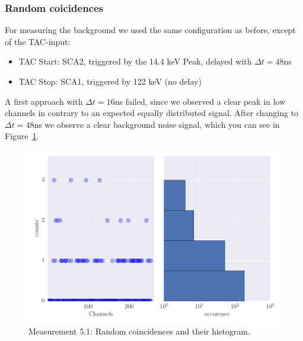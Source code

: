 \subsubsection{Random coicidences}
\label{ssub:Random coicidences}
For measuring the background we used the same configuration as before, except of the TAC-input:
\begin{itemize}
    \item TAC Start: SCA2, triggered by the 14.4 keV Peak, delayed with $\Delta t = 48$ns
    \item TAC Stop: SCA1, triggered by 122 keV (no delay)
\end{itemize}
A first approach with $\Delta t = 16$ns failed, since we observed a clear peak in low channels in contrary
to an expected equally distributed signal. After changing to $\Delta t=48$ns we observe a clear
background noise signal, which you can see in Figure~\ref{fig:5_1}.
\begin{figure}[htpb]
    \centering
    \includegraphics[width=1.0\linewidth]{analysis/figures/plot5_1_hist}
    \caption{Measurement 5.1: Random coincidences and their histogram.}
    \label{fig:5_1}
\end{figure}

\label{ssub:}

\clearpage

